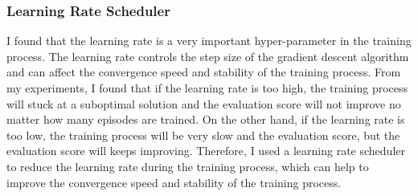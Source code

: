 \subsubsection{Learning Rate Scheduler}

I found that the learning rate is a very important hyper-parameter in the training process.
The learning rate controls the step size of the gradient descent algorithm and can affect the convergence speed and stability of the training process.
From my experiments, I found that if the learning rate is too high, the training process will stuck at a suboptimal solution and the evaluation score will not improve no matter how many episodes are trained.
On the other hand, if the learning rate is too low, the training process will be very slow and the evaluation score, but the evaluation score will keeps improving.
Therefore, I used a learning rate scheduler to reduce the learning rate during the training process, which can help to improve the convergence speed and stability of the training process.
